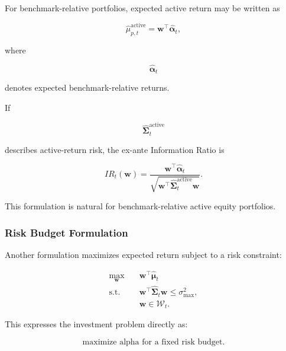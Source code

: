 \documentclass[11pt,a4paper]{article}
\begin{document}
For benchmark-relative portfolios, expected active return may be written as

\begin{equation}
\widehat{\mu}_{p,t}^{\mathrm{active}}
=
\mathbf{w}^{\top}
\widehat{\boldsymbol{\alpha}}_t,
\end{equation}

where

\begin{equation}
\widehat{\boldsymbol{\alpha}}_t
\end{equation}

denotes expected benchmark-relative returns.

If

\begin{equation}
\widehat{\boldsymbol{\Sigma}}_t^{\mathrm{active}}
\end{equation}

describes active-return risk, the ex-ante Information Ratio is

\begin{equation}
\boxed{
IR_t(\mathbf{w})
=
\frac{
\mathbf{w}^{\top}
\widehat{\boldsymbol{\alpha}}_t
}{
\sqrt{
\mathbf{w}^{\top}
\widehat{\boldsymbol{\Sigma}}_t^{\mathrm{active}}
\mathbf{w}
}
}.
}
\end{equation}

This formulation is natural for benchmark-relative active equity portfolios.


\subsubsection{Risk Budget Formulation}

Another formulation maximizes expected return subject to a risk constraint:

\begin{equation}
\boxed{
\begin{aligned}
\max_{\mathbf{w}}
\quad&
\mathbf{w}^{\top}
\widehat{\boldsymbol{\mu}}_t
\\
\text{s.t.}
\quad&
\mathbf{w}^{\top}
\widehat{\boldsymbol{\Sigma}}_t
\mathbf{w}
\leq
\sigma_{\max}^{2},
\\
&
\mathbf{w}
\in
\mathcal{W}_t.
\end{aligned}
}
\end{equation}

This expresses the investment problem directly as:

\begin{equation}
\boxed{
\text{maximize alpha for a fixed risk budget}.
}
\end{equation}
\end{document}
